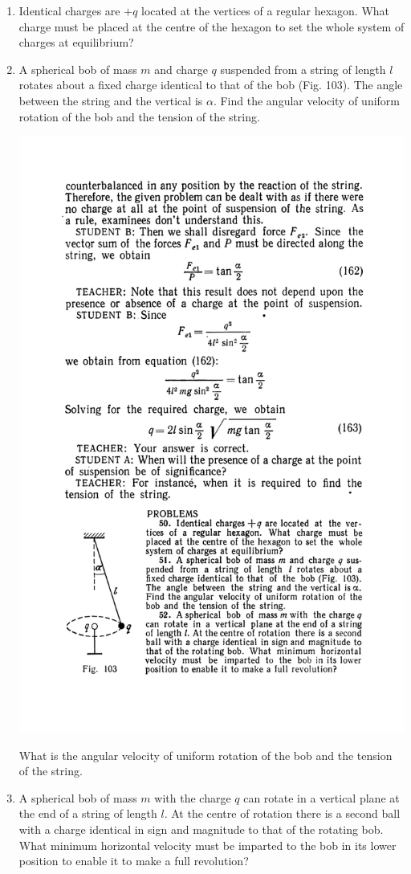 \documentclass[a4paper,sfsidenotes]{tufte-book}
\begin{document}
\begin{enumerate}[resume=problems]
\item Identical charges are $+q$ located at the vertices of a regular hexagon. What charge must be placed at the centre of the hexagon to set the whole system of charges at equilibrium?
\item A spherical bob of mass $m$ and charge $q$ suspended from a string of length $l$ rotates about a
fixed charge identical to that of the bob (Fig. 103). The angle between the string and the vertical is $\alpha$. Find the angular velocity of uniform rotation of the bob and the tension of the string.
\begin{marginfigure}%
\centering
\includegraphics[width=0.6\linewidth]{fig-103a}
\caption{What is the angular velocity of uniform rotation of the bob and the tension of the string.}
\label{fig-103}
\end{marginfigure}
\item A spherical bob of mass $m$ with the charge $q$ can rotate in a vertical plane at the end of a string of length $l$. At the centre of rotation there is a second ball with a charge identical in sign and magnitude to that of the rotating bob. What minimum horizontal velocity must be imparted to the bob in its lower position to enable it to make a full revolution?
\end{enumerate}

\cleardoublepage
\thispagestyle{empty}
\vspace*{2cm}
\end{document}
